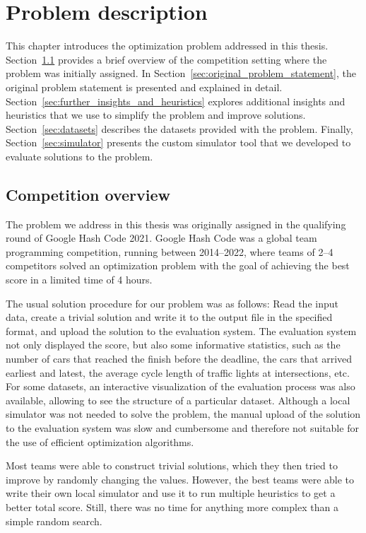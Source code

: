 \chapter{Problem description} \label{chap:problem_description}

This chapter introduces the optimization problem addressed in this thesis. Section~\ref{sec:competition_overview} provides a brief overview of the competition setting where the problem was initially assigned. In Section~\ref{sec:original_problem_statement}, the original problem statement is presented and explained in detail. Section~\ref{sec:further_insights_and_heuristics} explores additional insights and heuristics that we use to simplify the problem and improve solutions. Section~\ref{sec:datasets} describes the datasets provided with the problem. Finally, Section~\ref{sec:simulator} presents the custom simulator tool that we developed to evaluate solutions to the problem.

\section{Competition overview} \label{sec:competition_overview}

The problem we address in this thesis was originally assigned in the qualifying round of Google Hash Code 2021. Google Hash Code was a global team programming competition, running between 2014--2022, where teams of 2--4 competitors solved an optimization problem with the goal of achieving the best score in a limited time of 4 hours.

The usual solution procedure for our problem was as follows: Read the input data, create a trivial solution and write it to the output file in the specified format, and upload the solution to the evaluation system. The evaluation system not only displayed the score, but also some informative statistics, such as the number of cars that reached the finish before the deadline, the cars that arrived earliest and latest, the average cycle length of traffic lights at intersections, etc.
For some datasets, an interactive visualization of the evaluation process was also available, allowing to see the structure of a particular dataset. Although a local simulator was not needed to solve the problem, the manual upload of the solution to the evaluation system was slow and cumbersome and therefore not suitable for the use of efficient optimization algorithms.

Most teams were able to construct trivial solutions, which they then tried to improve by randomly changing the values. However, the best teams were able to write their own local simulator and use it to run multiple heuristics to get a better total score. Still, there was no time for anything more complex than a simple random search.

